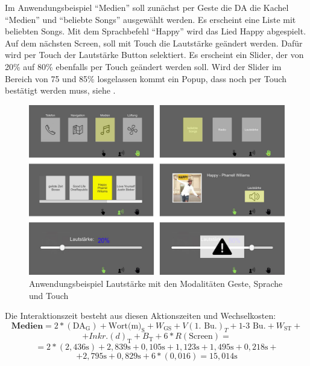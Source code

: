 Im Anwendungsbeispiel "`Medien"' soll zunächst per Geste die DA die Kachel "`Medien"' und "`beliebte Songs"' ausgewählt werden. 
Es erscheint eine Liste mit beliebten Songs. 
Mit dem Sprachbefehl "`Happy"' wird das Lied Happy abgespielt. 
Auf dem nächsten Screen, soll mit Touch die Lautstärke geändert werden. 
Dafür wird per Touch der Lautstärke Button selektiert. 
Es erscheint ein Slider, der von 20\% auf 80\% ebenfalls per Touch geändert werden soll. 
Wird der Slider im Bereich von 75 und 85\% losgelassen kommt ein Popup, dass noch per Touch bestätigt werden muss, siehe .
\begin{figure}[ht]
	\centering
		\includegraphics[width=1\textwidth]{img/UseCases_Eval_Medien.jpg}
	\caption{Anwendungsbeispiel Lautstärke mit den Modalitäten Geste, Sprache und Touch}
	\label{fig:UseCasesEvalMedien}
\end{figure}
Die Interaktionszeit besteht aus diesen Aktionszeiten und Wechselkosten:
\[
\textbf{Medien} = 2*(\text{DA}_\text{G}) + \text{Wort(m)}_\text{S} + W_\text{GS} + V(\text{1. Bu.})_T + \text{1-3 Bu.} + W_\text{ST} + 
\]
\[
 + Inkr.(d)_\text{T} + B_\text{T} + 6*R(\text{Screen}) =
\]
\[
= 2*( 2,436\text{s}) + 2,839\text{s} + 0,105\text{s} + 1,123\text{s} + 1,495\text{s} + 0,218\text{s} +
\]
\[
+2,795\text{s}+0,829\text{s} + 6*(0,016) = 15,014\text{s}
\]

